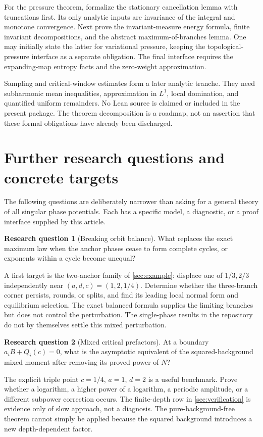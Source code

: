 \documentclass[11pt,a4paper]{article}
\numberwithin{equation}{section}
\theoremstyle{definition}
\newtheorem{question}{Research question}
\theoremstyle{remark}
\begin{document}
For the pressure theorem, formalize the stationary cancellation lemma
with truncations first. Its only analytic inputs are invariance of the
integral and monotone convergence. Next prove the invariant-measure
energy formula, finite invariant decompositions, and the abstract
maximum-of-branches lemma. One may initially state the latter for
variational pressure, keeping the topological-pressure interface as a
separate obligation. The final interface requires the expanding-map
entropy facts and the zero-weight approximation.

Sampling and critical-window estimates form a later analytic tranche.
They need subharmonic mean inequalities, approximation in $L^1$,
local domination, and quantified uniform remainders. No Lean source is
claimed or included in the present package. The theorem decomposition
is a roadmap, not an assertion that these formal obligations have
already been discharged.

\section{Further research questions and concrete targets}
\label{sec:questions}
The following questions are deliberately narrower than asking for a
general theory of all singular phase potentials. Each has a specific
model, a diagnostic, or a proof interface supplied by this article.

\begin{question}[Breaking orbit balance]
What replaces the exact maximum law when the anchor phases cease to
form complete cycles, or exponents within a cycle become unequal?
\end{question}
A first target is the two-anchor family of \cref{sec:example}: displace
one of $1/3,2/3$ independently near $(a,d,c)=(1,2,1/4)$. Determine
whether the three-branch corner persists, rounds, or splits, and find
its leading local normal form and equilibrium selection. The exact
balanced formula supplies the limiting branches but does not control
the perturbation. The single-phase results in the repository do not by
themselves settle this mixed perturbation.

\begin{question}[Mixed critical prefactors]
At a boundary $a_iB+Q_i(c)=0$, what is the asymptotic equivalent of the
squared-background mixed moment after removing its proved power of $N$?
\end{question}
The explicit triple point $c=1/4$, $a=1$, $d=2$ is a useful benchmark.
Prove whether a logarithm, a higher power of a logarithm, a periodic
amplitude, or a different subpower correction occurs. The finite-depth
row in \cref{sec:verification} is evidence only of slow approach, not
a diagnosis. The pure-background-free theorem cannot simply be applied
because the squared background introduces a new depth-dependent
factor.
\end{document}
